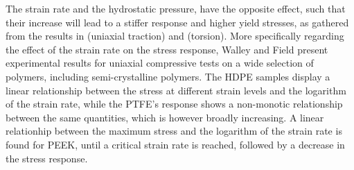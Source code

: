 The strain rate and the hydrostatic pressure, have the opposite effect, such that their increase will lead to a stiffer response and higher yield stresses, as gathered from the results in \cite{popelarViscoelasticMaterialCharacterization1990} (uniaxial traction) and \cite{trussEffectHydrostaticPressure1981} (torsion).
More specifically regarding the effect of the strain rate on the stress response, Walley and Field \citep{walleyStrainRateSensitivity1994} present experimental results for uniaxial compressive tests on a wide selection of polymers, including semi-crystalline polymers.
The HDPE samples display a linear relationship between the stress at different strain levels and the logarithm of the strain rate, while the PTFE's response shows a non-monotic relationship between the same quantities, which is however broadly increasing.
A linear relationhip between the maximum stress and the logarithm of the strain rate is found for PEEK, until a critical strain rate is reached, followed by a decrease in the stress response.

